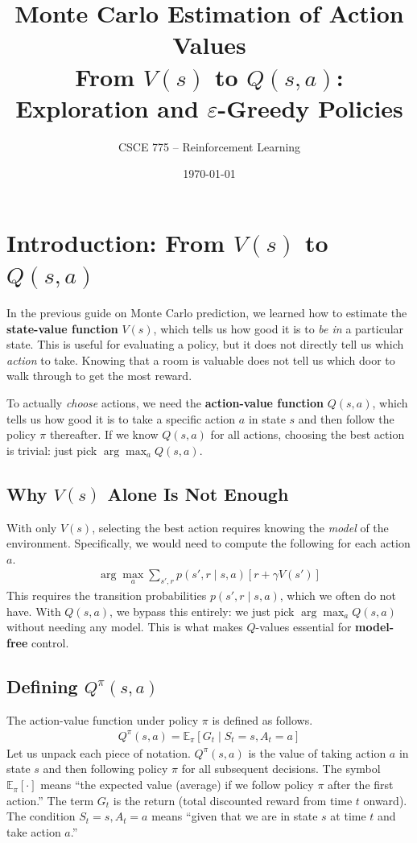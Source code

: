 \documentclass[journal, onecolumn]{IEEEtran}
\title{\textcolor{Garnet}{\textbf{Monte Carlo Estimation of Action Values}}\\[0.3em]
\large From $V(s)$ to $Q(s,a)$: Exploration and $\varepsilon$-Greedy Policies}
\author{CSCE 775 -- Reinforcement Learning}
\date{\today}
\newcommand{\vocab}[1]{\textbf{\textcolor{Garnet}{#1}}}
\begin{document}
\maketitle

\section{Introduction: From $V(s)$ to $Q(s,a)$}

In the previous guide on Monte Carlo prediction, we learned how to estimate the \vocab{state-value function} $V(s)$, which tells us how good it is to \textit{be in} a particular state. This is useful for evaluating a policy, but it does not directly tell us which \textit{action} to take. Knowing that a room is valuable does not tell us which door to walk through to get the most reward.

To actually \textit{choose} actions, we need the \vocab{action-value function} $Q(s,a)$, which tells us how good it is to take a specific action $a$ in state $s$ and then follow the policy $\pi$ thereafter. If we know $Q(s,a)$ for all actions, choosing the best action is trivial: just pick $\arg\max_a Q(s,a)$.

\subsection{Why $V(s)$ Alone Is Not Enough}

With only $V(s)$, selecting the best action requires knowing the \textit{model} of the environment. Specifically, we would need to compute the following for each action $a$.
\begin{align}
    \arg\max_a \sum_{s', r} p(s', r \mid s, a) \left[ r + \gamma V(s') \right]
\end{align}
This requires the transition probabilities $p(s', r \mid s, a)$, which we often do not have. With $Q(s,a)$, we bypass this entirely: we just pick $\arg\max_a Q(s,a)$ without needing any model. This is what makes $Q$-values essential for \vocab{model-free} control.

\subsection{Defining $Q^\pi(s,a)$}

The action-value function under policy $\pi$ is defined as follows.
\begin{align}
    Q^\pi(s,a) = \mathbb{E}_\pi\left[G_t \mid S_t = s, A_t = a\right]
\end{align}
Let us unpack each piece of notation. $Q^\pi(s,a)$ is the value of taking action $a$ in state $s$ and then following policy $\pi$ for all subsequent decisions. The symbol $\mathbb{E}_\pi[\cdot]$ means ``the expected value (average) if we follow policy $\pi$ after the first action.'' The term $G_t$ is the return (total discounted reward from time $t$ onward). The condition $S_t = s, A_t = a$ means ``given that we are in state $s$ at time $t$ and take action $a$.''
\end{document}
